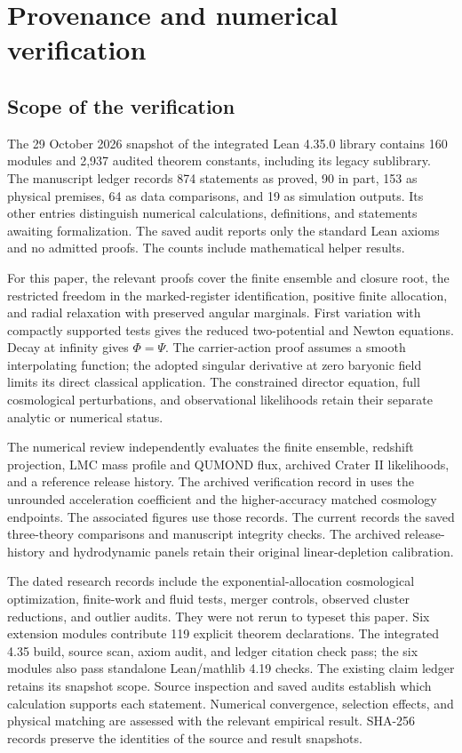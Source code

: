 \appendix
\section{Provenance and numerical verification}

\subsection{Scope of the verification}

The 29 October 2026 snapshot of the integrated Lean 4.35.0 library contains 160 modules and 2,937 audited theorem
constants, including its legacy sublibrary. The manuscript ledger records
874 statements as proved, 90 in part, 153 as physical premises, 64 as
data comparisons, and 19 as simulation outputs. Its other entries
distinguish numerical calculations, definitions, and statements awaiting
formalization. The saved audit reports only the standard Lean axioms
and no admitted proofs. The counts include mathematical helper results.

For this paper, the relevant proofs cover the finite ensemble and closure
root, the restricted freedom in the marked-register identification,
positive finite allocation, and radial relaxation with preserved angular
marginals. First variation with compactly supported tests gives the
reduced two-potential and Newton equations. Decay at infinity gives
$\Phi=\Psi$. The carrier-action proof assumes a smooth interpolating
function; the adopted singular derivative at zero baryonic field limits
its direct classical application. The constrained director equation,
full cosmological perturbations, and observational likelihoods retain
their separate analytic or numerical status.

The numerical review independently evaluates the finite ensemble,
redshift projection, LMC mass profile and QUMOND flux, archived Crater II
likelihoods, and a reference release history. The archived verification
record in  uses the unrounded acceleration
coefficient and the higher-accuracy matched cosmology endpoints.
The associated figures use those records. The current
 records the saved three-theory comparisons
and manuscript integrity checks. The archived release-history and
hydrodynamic panels retain their original linear-depletion calibration.

The dated research records include the exponential-allocation cosmological
optimization, finite-work and fluid tests, merger controls, observed cluster
reductions, and outlier audits. They were not rerun to typeset this paper.
Six extension modules contribute 119 explicit theorem declarations.
The integrated 4.35 build, source scan, axiom audit, and ledger citation
check pass; the six modules also pass standalone Lean/mathlib 4.19 checks.
The existing claim ledger retains its snapshot scope.  Source inspection and saved
audits establish which calculation supports each statement. Numerical
convergence, selection effects, and physical matching are assessed with
the relevant empirical result. SHA-256 records preserve the identities
of the source and result snapshots.

